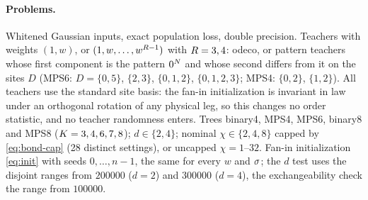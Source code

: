 \paragraph{Problems.}
Whitened Gaussian inputs, exact population loss, double precision. Teachers with weights $(1,w)$, or
$(1,w,\dots,w^{R-1})$ with $R=3,4$: odeco, or pattern teachers whose first component is the pattern
$0^N$ and whose second differs from it on the sites $D$ (MPS6: $D=\{0,5\}$, $\{2,3\}$,
$\{0,1,2\}$, $\{0,1,2,3\}$; MPS4: $\{0,2\}$, $\{1,2\}$). All teachers use the standard site basis: the fan-in
initialization is invariant in law under an orthogonal rotation of any physical leg, so this changes no order
statistic, and no teacher randomness enters. Trees binary4, MPS4, MPS6, binary8 and MPS8 ($K=3,4,6,7,8$);
$d\in\{2,4\}$; nominal $\chi\in\{2,4,8\}$ capped by \eqref{eq:bond-cap} (28 distinct settings), or uncapped
$\chi=1$--$32$. Fan-in initialization \eqref{eq:init} with seeds $0,\dots,n-1$, the same for every $w$ and
$\sigma$; the $d$ test uses the disjoint ranges from $200000$ ($d=2$) and $300000$ ($d=4$), the exchangeability check
the range from $100000$.

